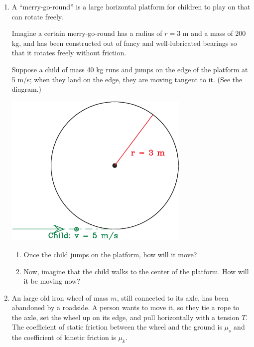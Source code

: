 \documentclass[12pt]{article}
\begin{document}
\begin{enumerate}
\bigskip
\bigskip
\newpage

\item A ``merry-go-round'' is a large horizontal platform for children to play on that can rotate freely. 

\begin{minipage}{0.5\textwidth}
Imagine a certain merry-go-round has a radius of $r=3$ m and a mass of 200 kg, and has been constructed out of fancy and well-lubricated bearings so that it rotates freely without friction.
\bigskip


Suppose a child of mass 40 kg runs and jumps on the edge of the platform at 5 m/s; when they land on the edge, they are moving tangent to it. (See the diagram.)
\end{minipage}
\begin{minipage}{0.5\textwidth}
	\includegraphics[width=0.7\textwidth]{mgr-crop.pdf}
\end{minipage}

	\begin{enumerate}
		\item Once the child jumps on the platform, how will it move?
		\item Now, imagine that the child walks to the center of the platform. How will it be moving now?
	\end{enumerate}

\bigskip\bigskip

\item An large old iron wheel of mass $m$, still connected to its axle, has been abandoned by a roadside. A person wants to move it, so they tie a rope to the axle, set the wheel up on its edge, and pull horizontally with a tension $T$. The coefficient of static friction between the wheel and the ground is $\mu_s$ and the coefficient of kinetic friction is $\mu_k$.


\end{enumerate}
\end{document}
